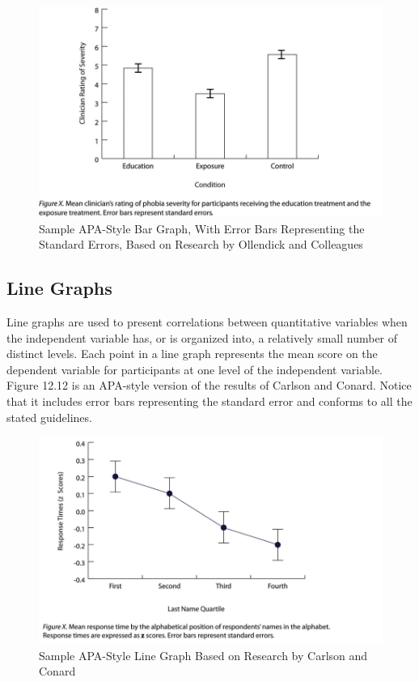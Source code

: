 \begin{figure}
\includegraphics[width=\linewidth]{figures/Fig12-11}
\caption{Sample APA-Style Bar Graph, With Error Bars Representing the Standard Errors, Based on Research by Ollendick and Colleagues}
\label{fig:barwitherror}
\end{figure}


\subsection{Line Graphs}

Line graphs are used to present correlations between quantitative variables when the independent variable has, or is organized into, a relatively small number of distinct levels. Each point in a line graph represents the mean score on the dependent variable for participants at one level of the independent variable. Figure 12.12 is an APA-style version of the results of Carlson and Conard. Notice that it includes error bars representing the standard error and conforms to all the stated guidelines.

\begin{figure}
\includegraphics[width=\linewidth]{figures/Fig12-12}
\caption{Sample APA-Style Line Graph Based on Research by Carlson and Conard}
\label{fig:lineAPA}
\end{figure}

